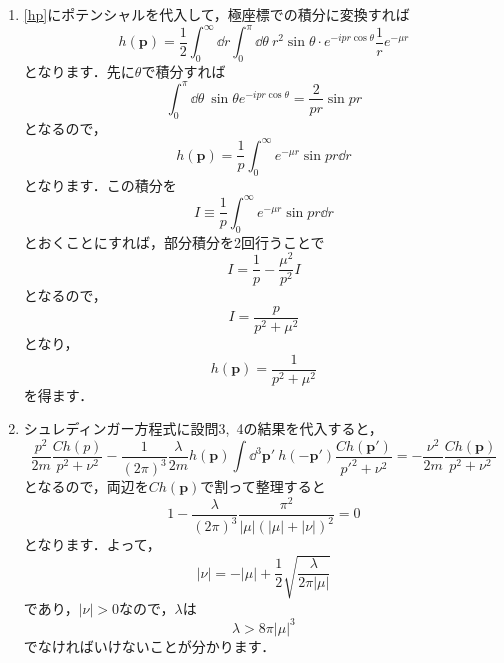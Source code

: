 \documentclass[a4paper,pdflatex,ja=standard]{bxjsarticle}
\begin{document}
\begin{enumerate}
  \item 

  \eqref{hp}にポテンシャルを代入して，極座標での積分に変換すれば
  \begin{equation}
    h(\bm{p})
    =
    \frac{1}{2}
    \int_{0}^{\infty}\dd r\int_{0}^{\pi}\dd\theta\ 
    r^2\sin\theta\cdot e^{-ipr\cos\theta}\frac{1}{r}e^{-\mu r} 
  \end{equation}
  となります．先に$\theta$で積分すれば
  \begin{equation}
    \int_{0}^{\pi}\dd\theta\ 
    \sin\theta e^{-ipr\cos\theta}
    =
    \frac{2}{pr}\sin pr
  \end{equation}
  となるので，
  \begin{equation}
    h(\bm{p})
    =
    \frac{1}{p}
    \int_{0}^{\infty}
    e^{-\mu r}\sin pr
    \dd r
  \end{equation}
  となります．この積分を
  \begin{equation}
    I
    \equiv    
    \frac{1}{p}
    \int_{0}^{\infty}
    e^{-\mu r}\sin pr
    \dd r
  \end{equation}
  とおくことにすれば，部分積分を2回行うことで
  \begin{equation}
    I=\frac{1}{p}-\frac{\mu^2}{p^2}I
  \end{equation}
  となるので，
  \begin{equation}
    I
    =
    \frac{p}{p^2+\mu^2}
  \end{equation}
  となり，
  \begin{equation}
    h(\bm{p})
    =
    \frac{1}{p^2+\mu^2}
  \end{equation}
  を得ます．


  \item 

  シュレディンガー方程式に設問3,\ 4の結果を代入すると，
  \begin{equation}
    \frac{p^2}{2m}\frac{Ch(p)}{p^2+\nu^2}
    -
    \frac{1}{(2\pi)^3}\frac{\lambda}{2m}h(\bm{p})
    \int\dd^3\bm{p}'\ 
    h(-\bm{p}')\frac{Ch(\bm{p}')}{{p'}^2+\nu^2}
    =
    -\frac{\nu^2}{2m}\frac{Ch(\bm{p})}{p^2+\nu^2}
  \end{equation}
  となるので，両辺を$Ch(\bm{p})$で割って整理すると
  \begin{equation}
    1
    -
    \frac{\lambda}{(2\pi)^3}
    \frac{\pi^2}{|\mu|(|\mu|+|\nu|)^2}
    =
    0
  \end{equation}
  となります．よって，
  \begin{equation}
    |\nu|
    =
    -|\mu|
    +
    \frac{1}{2}
    \sqrt{\frac{\lambda}{2\pi|\mu|}}
  \end{equation}
  であり，$|\nu|>0$なので，$\lambda$は
  \begin{equation}
    \lambda>8\pi|\mu|^3
  \end{equation}
  でなければいけないことが分かります．



\end{enumerate}
\end{document}
